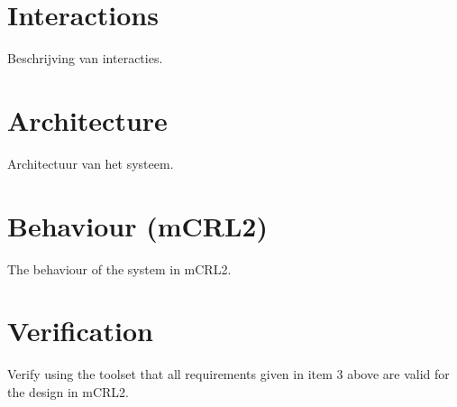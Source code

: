 \documentclass{article}
\begin{document}
\section{Interactions}
Beschrijving van interacties.

\section{Architecture}
Architectuur van het systeem.

\section{Behaviour (mCRL2)}
The behaviour of the system in mCRL2.

\section{Verification}
Verify using the toolset that all requirements given in item 3 above are valid for the design
in mCRL2.
\end{document}
